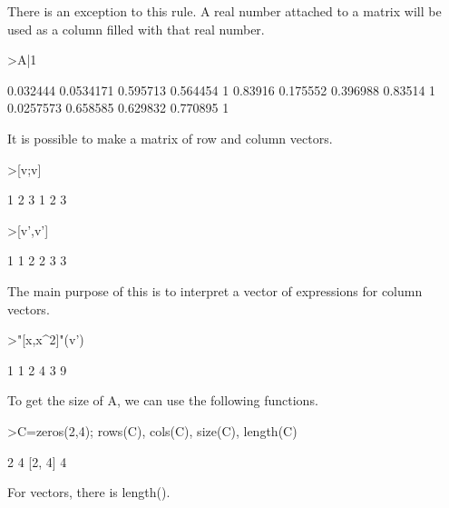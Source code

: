 \documentclass{article}
\begin{document}
\begin{eulernotebook}
\begin{eulercomment}
\begin{eulercomment}
\begin{eulercomment}
\begin{eulercomment}
\begin{eulercomment}
\begin{eulercomment}
\begin{eulercomment}
There is an exception to this rule. A real number attached to a matrix
will be used as a column filled with that real number.
\end{eulercomment}
\begin{eulerprompt}
>A|1
\end{eulerprompt}
\begin{euleroutput}
       0.032444     0.0534171      0.595713      0.564454             1 
        0.83916      0.175552      0.396988       0.83514             1 
      0.0257573      0.658585      0.629832      0.770895             1 
\end{euleroutput}
\begin{eulercomment}
It is possible to make a matrix of row and column vectors.
\end{eulercomment}
\begin{eulerprompt}
>[v;v]
\end{eulerprompt}
\begin{euleroutput}
              1             2             3 
              1             2             3 
\end{euleroutput}
\begin{eulerprompt}
>[v',v']
\end{eulerprompt}
\begin{euleroutput}
              1             1 
              2             2 
              3             3 
\end{euleroutput}
\begin{eulercomment}
The main purpose of this is to interpret a vector of expressions for
column vectors.
\end{eulercomment}
\begin{eulerprompt}
>"[x,x^2]"(v')
\end{eulerprompt}
\begin{euleroutput}
              1             1 
              2             4 
              3             9 
\end{euleroutput}
\begin{eulercomment}
To get the size of A, we can use the following functions.
\end{eulercomment}
\begin{eulerprompt}
>C=zeros(2,4); rows(C), cols(C), size(C), length(C)
\end{eulerprompt}
\begin{euleroutput}
  2
  4
  [2,  4]
  4
\end{euleroutput}
\begin{eulercomment}
For vectors, there is length().

\end{eulercomment}
\end{eulercomment}
\end{eulercomment}
\end{eulercomment}
\end{eulercomment}
\end{eulercomment}
\end{eulercomment}
\end{eulernotebook}
\end{document}
